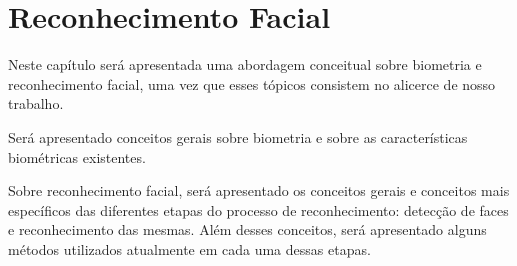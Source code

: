 



\chapter{Reconhecimento Facial}

	Neste capítulo será apresentada uma abordagem conceitual sobre biometria e reconhecimento facial, uma vez que esses tópicos consistem no alicerce de nosso trabalho. 

	Será apresentado conceitos gerais sobre biometria e sobre as características biométricas existentes.

	Sobre reconhecimento facial, será apresentado os conceitos gerais e conceitos mais específicos das diferentes etapas do processo de reconhecimento: detecção de faces e reconhecimento das mesmas. Além desses conceitos, será apresentado alguns métodos utilizados atualmente em cada uma dessas etapas.


	
	







